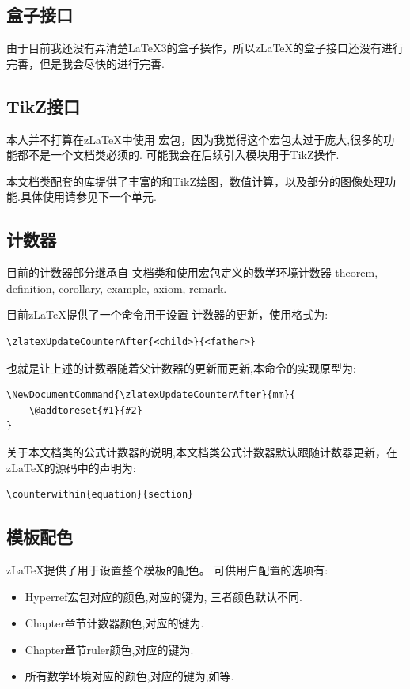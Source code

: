 \subsection{盒子接口}
由于目前我还没有弄清楚\LaTeX3的盒子操作，所以z\LaTeX{}的盒子接口还没有进行完善，但是我会尽快的进行完善.

\subsection{TikZ接口}
本人并不打算在z\LaTeX{}中使用  宏包，因为我觉得这个宏包太过于庞大,很多的功能都不是一个文档类必须的.
可能我会在后续引入模块用于TikZ操作. 

\begin{leftbar}
本文档类配套的库提供了丰富的和TikZ绘图，数值计算，以及部分的图像处理功能.具体使用请参见下一个单元.
\end{leftbar}

\subsection{计数器}
目前的计数器部分继承自 文档类和使用宏包定义的数学环境计数器 
theorem, definition, corollary, example, axiom, remark.

目前z\LaTeX{}提供了一个命令\cmd{\zlatexUpdateCounterAfter}\index{\cmd{\zlatexUpdateCounterAfter}}用于设置
计数器的更新，使用格式为:
\begin{verbatim}
\zlatexUpdateCounterAfter{<child>}{<father>}
\end{verbatim}

也就是让上述的计数器随着父计数器的更新而更新,本命令的实现原型为:
\begin{verbatim}
\NewDocumentCommand{\zlatexUpdateCounterAfter}{mm}{
    \@addtoreset{#1}{#2}
}
\end{verbatim}

关于本文档类的公式计数器的说明,本文档类公式计数器默认跟随计数器更新，在z\LaTeX{}的源码中的声明为:
\begin{verbatim}
\counterwithin{equation}{section}
\end{verbatim}

\subsection{模板配色}
z\LaTeX{}提供了\cmd{\zlatexColorSetup}\index{\cmd{\zlatexColorSetup}}用于设置整个模板的配色。
可供用户配置的选项有:
\begin{itemize}
    \item Hyperref宏包对应的颜色,对应的键为, 三者颜色默认不同.
    \item Chapter章节计数器颜色,对应的键为.
    \item Chapter章节ruler颜色,对应的键为.
    \item 所有数学环境对应的颜色,对应的键为,如等.
\end{itemize}

